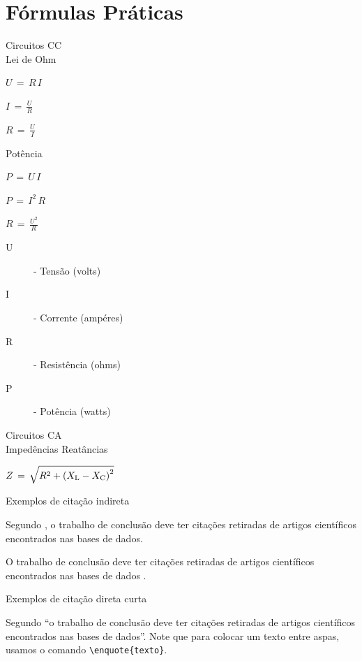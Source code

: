 \documentclass[12pt]{article}
\begin{document}
\section{Fórmulas Práticas}
Circuitos CC\\
Lei de Ohm
\begin{multicols}{3}
$U\, =\, R\, I$ \par
$I\, =\, \frac{U}{R}$ \par
$R\, =\, \frac{U}{I}$
\end{multicols}
Potência
\begin{multicols}{3}
$P\, =\, U\, I$ \par
$P\, =\, I^2\, R$ \par
$R\, =\, \frac{U^2}{R}$
\end{multicols}
\begin{description}
    \item[U] - Tensão (volts)
    \item[I] - Corrente (ampéres)
    \item[R] - Resistência (ohms)
    \item[P] - Potência (watts)
\end{description}

Circuitos CA \\
Impedências Reatâncias \par
$Z\,=\, \sqrt{R^2 + \qty(X_\mathrm{L} - X_\mathrm{C})^2}$


\begin{description}
    \item[Exemplos de citação indireta]    
\end{description}

Segundo \textcite{spinello2024}, o trabalho de conclusão deve ter citações retiradas de artigos científicos encontrados nas bases de dados. 

O trabalho de conclusão deve ter citações retiradas de artigos científicos encontrados nas bases de dados \cite{spinello2024}.

\begin{description}
    \item[Exemplos de citação direta curta]
\end{description}

Segundo \textcite{spinello2024} \enquote{o trabalho de conclusão deve ter citações retiradas de artigos científicos encontrados nas bases de dados}. Note que para colocar um texto entre aspas, usamos o comando \verb|\enquote{texto}|.
\end{document}
